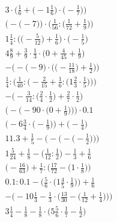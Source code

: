 \documentclass[8pt]{article}
\begin{document}
\begin{align}
3 \cdot \Big(\frac{1}{6} + \big(-1\frac{1}{6}\big) \cdot \big(-\frac{1}{7}\big)\Big) \\
\Big(-\big(-7\big)\Big) \cdot \Big(\frac{1}{56} : \big(\frac{1}{72} + \frac{1}{9}\big)\Big) \\
1\frac{1}{4} : \Big(\big(-\frac{5}{12}\big) + \frac{1}{6}\Big) \cdot \Big(-\frac{1}{5}\Big) \\
4\frac{8}{9} + \frac{3}{9} \cdot \frac{1}{3} \cdot \big(0 + \frac{4}{45} + \frac{1}{9}\big) \\
-\bigg(-\Big(-9\Big) \cdot \Big(\big(-\frac{11}{18}\big) + \frac{1}{2}\Big)\bigg) \\
\frac{1}{4} : \bigg(\frac{1}{40} : \Big(-\frac{2}{15} + \frac{1}{6} : \big(1\frac{2}{3} \cdot \frac{1}{5}\big)\Big)\bigg) \\
-\Big(-\frac{3}{14} : \big(\frac{2}{4} \cdot \frac{1}{2}\big) + \frac{2}{7} \cdot \frac{1}{2}\Big) \\
\bigg(-\Big(-90 \cdot \big(0 + \frac{1}{9}\big)\Big)\bigg) \cdot 0.1 \\
\Big(-6\frac{3}{4} \cdot \big(-\frac{1}{9}\big)\Big) + \Big(-\frac{1}{4}\Big) \\
11.3 + \frac{1}{5} - \bigg(-\Big(-\big(-\frac{1}{2}\big)\Big)\bigg) \\
1\frac{5}{24} + \frac{1}{8} - \big(\frac{1}{12} : \frac{1}{2}\big) - \frac{1}{3} + \frac{1}{6} \\
\Big(-\frac{16}{63}\Big) + \frac{1}{7} : \Big(\frac{17}{72} - \big(1 \cdot \frac{1}{8}\big)\Big) \\
0.1 : 0.1 - \Big(\frac{5}{6} \cdot \big(1\frac{4}{5} \cdot \frac{1}{9}\big)\Big) + \frac{1}{6} \\
-\bigg(-10\frac{1}{3} - \frac{1}{3} \cdot \Big(\frac{13}{30} - \big(\frac{1}{12} + \frac{1}{4}\big)\Big)\bigg) \\
3\frac{1}{4} - \frac{1}{8} - \frac{1}{8} \cdot \big(5\frac{5}{6} \cdot \frac{1}{7} - \frac{1}{2}\big)
\end{align}
\end{document}
